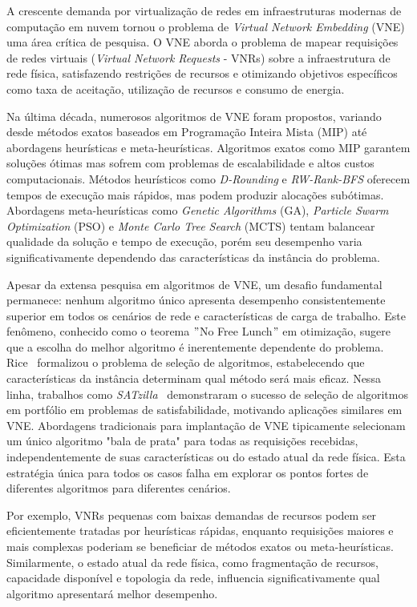 \documentclass[conference]{IEEEtran}
\begin{document}
A crescente demanda por virtualização de redes em infraestruturas modernas de computação em nuvem tornou o problema de \textit{Virtual Network Embedding} (VNE) uma área crítica de pesquisa. O VNE aborda o problema de mapear requisições de redes virtuais (\textit{Virtual Network Requests} - VNRs) sobre a infraestrutura de rede física, satisfazendo restrições de recursos e otimizando objetivos específicos como taxa de aceitação, utilização de recursos e consumo de energia.

Na última década, numerosos algoritmos de VNE foram propostos, variando desde métodos exatos baseados em Programação Inteira Mista (MIP) até abordagens heurísticas e meta-heurísticas. Algoritmos exatos como MIP garantem soluções ótimas mas sofrem com problemas de escalabilidade e altos custos computacionais. Métodos heurísticos como \textit{D-Rounding} e \textit{RW-Rank-BFS} oferecem tempos de execução mais rápidos, mas podem produzir alocações subótimas. Abordagens meta-heurísticas como \textit{Genetic Algorithms} (GA), \textit{Particle Swarm Optimization} (PSO) e \textit{Monte Carlo Tree Search} (MCTS) tentam balancear qualidade da solução e tempo de execução, porém seu desempenho varia significativamente dependendo das características da instância do problema.

Apesar da extensa pesquisa em algoritmos de VNE, um desafio fundamental permanece: nenhum algoritmo único apresenta desempenho consistentemente superior em todos os cenários de rede e características de carga de trabalho.
Este fenômeno, conhecido como o teorema \("\)No Free Lunch\("\) em otimização, sugere que a escolha do melhor algoritmo é inerentemente dependente do problema.
Rice~\cite{rice1976algorithm} formalizou o problema de seleção de algoritmos, estabelecendo que características da instância determinam qual método será mais eficaz.
Nessa linha, trabalhos como \textit{SATzilla}~\cite{xu2012satzilla} demonstraram o sucesso de seleção de algoritmos em portfólio em problemas de satisfabilidade, motivando aplicações similares em VNE.
Abordagens tradicionais para implantação de VNE tipicamente selecionam um único algoritmo "bala de prata" para todas as requisições recebidas, independentemente de suas características ou do estado atual da rede física.
Esta estratégia única para todos os casos falha em explorar os pontos fortes de diferentes algoritmos para diferentes cenários.

Por exemplo, VNRs pequenas com baixas demandas de recursos podem ser eficientemente tratadas por heurísticas rápidas, enquanto requisições maiores e mais complexas poderiam se beneficiar de métodos exatos ou meta-heurísticas. Similarmente, o estado atual da rede física, como fragmentação de recursos, capacidade disponível e topologia da rede, influencia significativamente qual algoritmo apresentará melhor desempenho.
\end{document}
